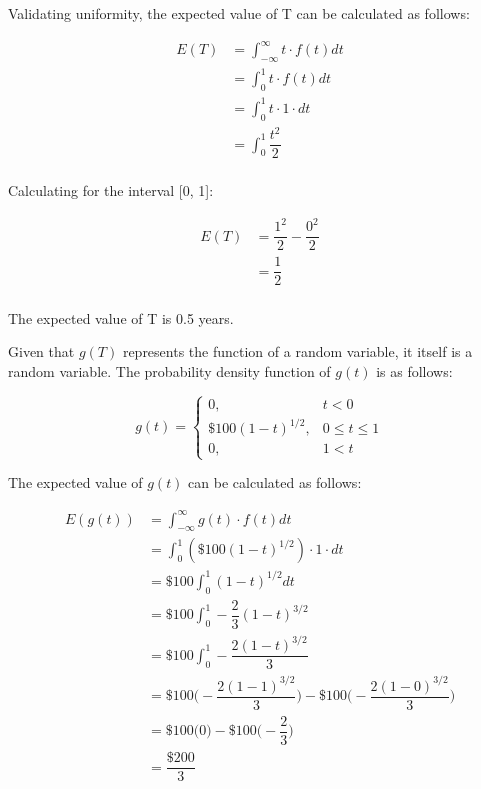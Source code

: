 \documentclass[12pt,a4paper]{article}
\numberwithin{equation}{subsection}
\begin{document}
\begin{enumerate}
Validating uniformity, the expected value of T can be calculated as follows:

\begin{equation*}
\begin{split}
E(T) &= \int_{-\infty}^{\infty}t \cdot f(t)dt \\
& = \int_{0}^{1}t \cdot f(t)dt \\
& = \int_{0}^{1}t \cdot 1\cdot dt \\
& = \int_{0}^{1}\dfrac{t^2}{2} \\
\end{split}
\end{equation*}

Calculating for the interval [0, 1]:

\begin{equation*}
\begin{split}
E(T) &= \dfrac{1^2}{2} - \dfrac{0^2}{2} \\
& = \dfrac{1}{2} \\
\end{split}
\end{equation*}

The expected value of T is 0.5 years.

Given that $g(T)$ represents the function of a random variable, it itself is a random variable.  The probability density function of $g(t)$ is as follows:

\begin{equation*}
g(t) = \begin{cases} 0, &t < 0 \\
\$100(1-t)^{1/2}, &0 \leq t \leq 1 \\ 
0, &1 < t
\end{cases}
\end{equation*}

The expected value of $g(t)$ can be calculated as follows:

\begin{equation*}
\begin{split}
E(g(t)) &= \int_{-\infty}^{\infty}g(t) \cdot f(t)dt \\
&= \int_{0}^{1}(\$100(1-t)^{1/2}) \cdot 1 \cdot dt \\
&= \$100 \int_{0}^{1}(1-t)^{1/2} dt \\
&= \$100 \int_{0}^{1}-\dfrac{2}{3}(1-t)^{3/2} \\
&= \$100 \int_{0}^{1}-\dfrac{2 (1-t)^{3/2}}{3} \\
&= \$100 \bigg(-\dfrac{2(1-1)^{3/2}}{3}\bigg) - \$100 \bigg(-\dfrac{2(1-0)^{3/2}}{3}\bigg) \\
&= \$100 \bigg(0\bigg) - \$100 \bigg(-\dfrac{2}{3}\bigg) \\
&= \dfrac{\$200}{3} \\
\end{split}
\end{equation*}


\end{enumerate}
\end{document}
